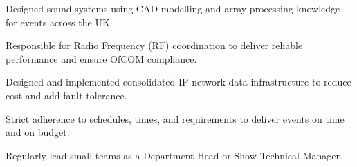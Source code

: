 \sectionsep
{}
\begin{tightemize}
  \item Designed sound systems using CAD modelling and array processing knowledge for events across the UK.
  \item Responsible for Radio Frequency (RF) coordination to deliver reliable performance and ensure OfCOM compliance.
  \item Designed and implemented consolidated IP network data infrastructure to reduce cost and add fault tolerance.
  \item Strict adherence to schedules, times, and requirements to deliver events on time and on budget.
  \item Regularly lead small teams as a Department Head or Show Technical Manager.
\end{tightemize}
\sectionsep
